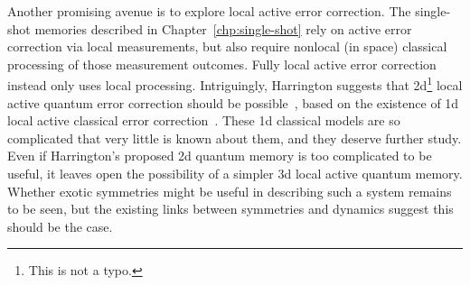 Another promising avenue is to explore local active error correction. The single-shot memories described in Chapter~\ref{chp:single-shot} rely on active error correction via local measurements, but also require nonlocal (in space) classical processing of those measurement outcomes. Fully local active error correction instead only uses local processing. Intriguingly, Harrington suggests that 2d\footnote{This is not a typo.} local active quantum error correction should be possible~\cite{Harrington2004Thesis}, based on the existence of 1d local active classical error correction~\cite{Gacs1983Reliable, Gacs2001Reliable, Gray2001Readers}. These 1d classical models are so complicated that very little is known about them, and they deserve further study. Even if Harrington's proposed 2d quantum memory is too complicated to be useful, it leaves open the possibility of a simpler 3d local active quantum memory. Whether exotic symmetries might be useful in describing such a system remains to be seen, but the existing links between symmetries and dynamics suggest this should be the case.
